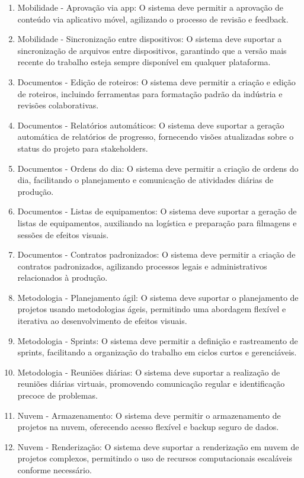 \begin{enumerate}
  \item Mobilidade - Aprovação via app: O sistema deve permitir a aprovação de conteúdo via aplicativo móvel, agilizando o processo de revisão e feedback.
  \item Mobilidade - Sincronização entre dispositivos: O sistema deve suportar a sincronização de arquivos entre dispositivos, garantindo que a versão mais recente do trabalho esteja sempre disponível em qualquer plataforma.
  \item Documentos - Edição de roteiros: O sistema deve permitir a criação e edição de roteiros, incluindo ferramentas para formatação padrão da indústria e revisões colaborativas.
  \item Documentos - Relatórios automáticos: O sistema deve suportar a geração automática de relatórios de progresso, fornecendo visões atualizadas sobre o status do projeto para stakeholders.
  \item Documentos - Ordens do dia: O sistema deve permitir a criação de ordens do dia, facilitando o planejamento e comunicação de atividades diárias de produção.
  \item Documentos - Listas de equipamentos: O sistema deve suportar a geração de listas de equipamentos, auxiliando na logística e preparação para filmagens e sessões de efeitos visuais.
  \item Documentos - Contratos padronizados: O sistema deve permitir a criação de contratos padronizados, agilizando processos legais e administrativos relacionados à produção.
  \item Metodologia - Planejamento ágil: O sistema deve suportar o planejamento de projetos usando metodologias ágeis, permitindo uma abordagem flexível e iterativa ao desenvolvimento de efeitos visuais.
  \item Metodologia - Sprints: O sistema deve permitir a definição e rastreamento de sprints, facilitando a organização do trabalho em ciclos curtos e gerenciáveis.
  \item Metodologia - Reuniões diárias: O sistema deve suportar a realização de reuniões diárias virtuais, promovendo comunicação regular e identificação precoce de problemas.
  \item Nuvem - Armazenamento: O sistema deve permitir o armazenamento de projetos na nuvem, oferecendo acesso flexível e backup seguro de dados.
  \item Nuvem - Renderização: O sistema deve suportar a renderização em nuvem de projetos complexos, permitindo o uso de recursos computacionais escaláveis conforme necessário.

\end{enumerate}
